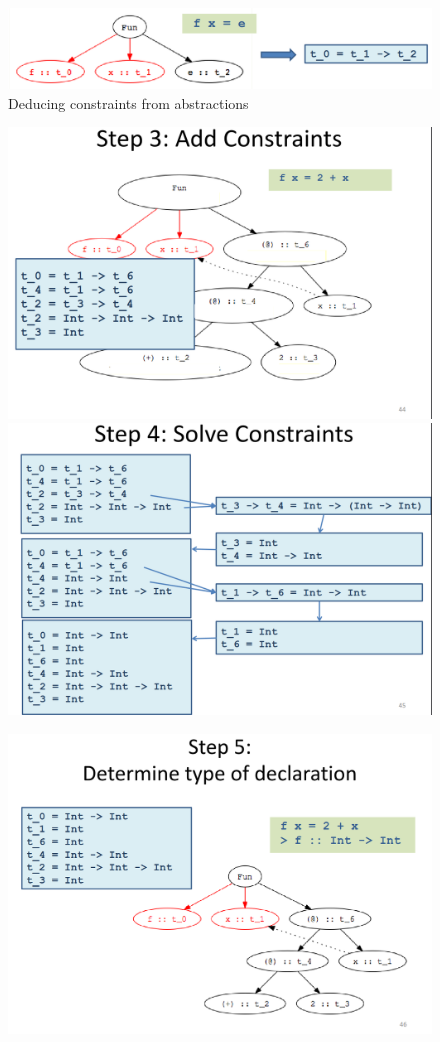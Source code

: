 \begin{figure}[htbp]
   \centering
   \includegraphics{images/typeinference_constraints_abstraction.png}
   \caption{Deducing constraints from abstractions}
   \label{fig:typeinference_constraints_abstraction}
\end{figure}


\begin{figure}[htbp]
   \centering
   \includegraphics[width=0.4\columnwidth]{images/typeinference_step3.png}
   \includegraphics[width=0.4\columnwidth]{images/typeinference_step4.png}
   \label{fig:typeinference_step3_4}
\end{figure}

\begin{figure}[htbp]
   \centering
   \includegraphics[width=0.4\columnwidth]{images/typeinference_step5.png}
   \label{fig:typeinference_step5}
\end{figure}
\newpage

